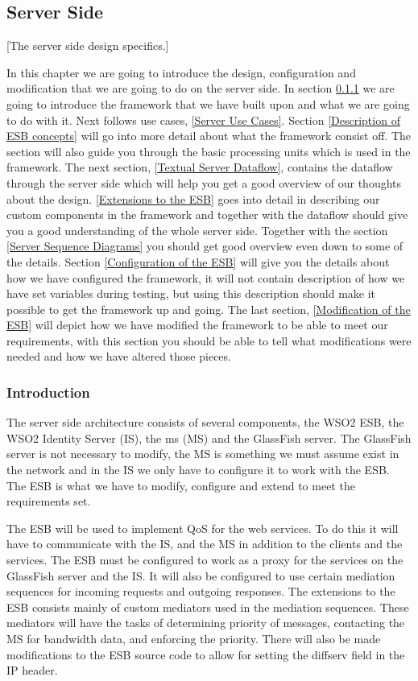     \subsection{Server Side}\label{Server Side Design} [The server side design specifics.]

    In this chapter we are going to introduce the design, configuration and modification that we are going to do on the server side. In section \ref{Server Introduction} we are going to introduce the framework that we have built upon and what we are going to do with it. Next follows use cases, \ref{Server Use Cases}. Section \ref{Description of ESB concepts} will go into more detail about what the framework consist off. The section will also guide you through the basic processing units which is used in the framework. The next section, \ref{Textual Server Dataflow}, contains the dataflow through the server side which will help you get a good overview of our thoughts about the design. \ref{Extensions to the ESB} goes into detail in describing our custom components in the framework and together with the dataflow should give you a good understanding of the whole server side. Together with the section \ref{Server Sequence Diagrams} you should get good overview even down to some of the details. Section \ref{Configuration of the ESB} will give you the details about how we have configured the framework, it will not contain description of how we have set variables during testing, but using this description should make it possible to get the framework up and going. The last section, \ref{Modification of the ESB} will depict how we have modified the framework to be able to meet our requirements, with this section you should be able to tell what modifications were needed and how we have altered those pieces. 

    \subsubsection{Introduction}\label{Server Introduction}
    The server side architecture consists of several components, the WSO2 ESB, the WSO2 Identity Server (IS), the \gls{ms} (MS) and the GlassFish server. The GlassFish server is not necessary to modify, the MS is something we must assume exist in the network and in the IS we only have to configure it to work with the ESB. The ESB is what we have to modify, configure and extend to meet the requirements set.

    The ESB will be used to implement QoS for the web services. To do this it will have to communicate with the IS, and the MS in addition to the clients and the services. The ESB must be configured to work as a proxy for the services on the GlassFish server and the IS. It will also be configured to use certain mediation sequences for incoming requests and outgoing responses. The extensions to the ESB consists mainly of custom mediators used in the mediation sequences. These mediators will have the tasks of determining priority of messages, contacting the MS for bandwidth data, and enforcing the priority. There will also be made modifications to the ESB source code to allow for setting the diffserv field in the IP header.
    
